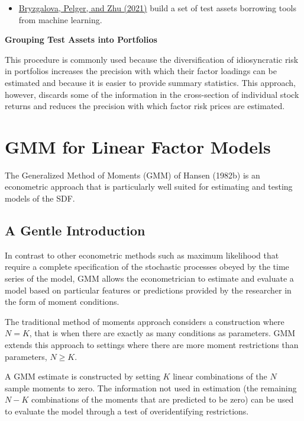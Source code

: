 \documentclass[
]{book}
\providecommand{\tightlist}{%
  \setlength{\itemsep}{0pt}\setlength{\parskip}{0pt}}
\begin{document}
\begin{itemize}
\tightlist
\item
  \href{https://papers.ssrn.com/sol3/papers.cfm?abstract_id=3493458}{Bryzgalova, Pelger, and Zhu (2021)} build a set of test assets borrowing tools from machine learning.
\end{itemize}

\textbf{Grouping Test Assets into Portfolios}

This procedure is commonly used because the diversification of idiosyncratic risk in portfolios increases the precision with which their factor loadings can be estimated and because it is easier to provide summary statistics. This approach, however, discards some of the information in the cross-section of individual stock returns and reduces the precision with which factor risk prices are estimated.

\hypertarget{gmm-for-linear-factor-models}{%
\section{GMM for Linear Factor Models}\label{gmm-for-linear-factor-models}}

The Generalized Method of Moments (GMM) of Hansen (1982b) is an econometric approach that is particularly well suited for estimating and testing models of the SDF.

\hypertarget{a-gentle-introduction}{%
\subsection{A Gentle Introduction}\label{a-gentle-introduction}}

In contrast to other econometric methods such as maximum likelihood that require a complete specification of the stochastic processes obeyed by the time series of the model, GMM allows the econometrician to estimate and evaluate a model based on particular features or predictions provided by the researcher in the form of moment conditions.

The traditional method of moments approach considers a construction where \(N=K\), that is when there are exactly as many conditions as parameters. GMM extends this approach to settings where there are more moment restrictions than parameters, \(N\geq K\).

A GMM estimate is constructed by setting \(K\) linear combinations of the \(N\) sample moments to zero. The information not used in estimation (the remaining \(N-K\) combinations of the moments that are predicted to be zero) can be used to evaluate the model through a test of overidentifying restrictions.
\end{document}

